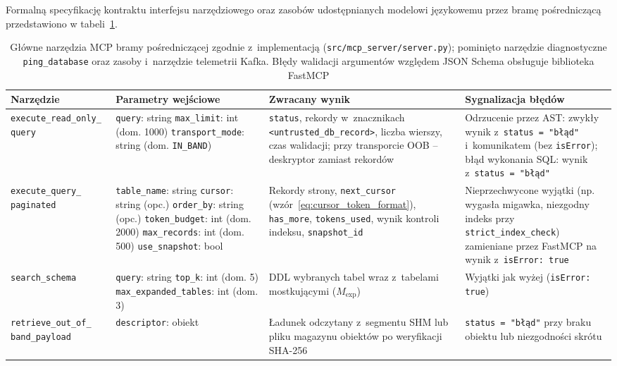 Formalną specyfikację kontraktu interfejsu narzędziowego oraz zasobów udostępnianych modelowi językowemu przez bramę pośredniczącą przedstawiono w tabeli~\ref{tab:mcp_interface_contract}.

\begin{table}[!htbp]
\centering
\footnotesize
\caption[Kontrakt interfejsu narzędziowego bramy MCP]{Główne narzędzia MCP bramy pośredniczącej zgodnie z~implementacją (\texttt{src/mcp\_server/server.py}); pominięto narzędzie diagnostyczne \texttt{ping\_database} oraz zasoby i~narzędzie telemetrii Kafka. Błędy walidacji argumentów względem JSON Schema obsługuje biblioteka FastMCP}
\label{tab:mcp_interface_contract}
\begin{tabular}{p{2.8cm} p{3.4cm} p{4.6cm} p{3.0cm}}
\toprule
\textbf{Narzędzie} & \textbf{Parametry wejściowe} & \textbf{Zwracany wynik} & \textbf{Sygnalizacja błędów} \\
\midrule
\texttt{execute\_read\_only\_} \texttt{query} &
\texttt{query}: string \newline
\texttt{max\_limit}: int (dom. 1000) \newline
\texttt{transport\_mode}: string (dom. \texttt{IN\_BAND}) &
\texttt{status}, rekordy w~znacznikach \texttt{<untrusted\_db\_record>}, liczba wierszy, czas walidacji; przy transporcie OOB -- deskryptor zamiast rekordów &
Odrzucenie przez AST: zwykły wynik z~\texttt{status = "błąd"} i~komunikatem (bez \texttt{isError}); błąd wykonania SQL: wynik z~\texttt{status = "błąd"} \\
\addlinespace
\texttt{execute\_query\_} \texttt{paginated} &
\texttt{table\_name}: string \newline
\texttt{cursor}: string (opc.) \newline
\texttt{order\_by}: string (opc.) \newline
\texttt{token\_budget}: int (dom. 2000) \newline
\texttt{max\_records}: int (dom. 500) \newline
\texttt{use\_snapshot}: bool &
Rekordy strony, \texttt{next\_cursor} (wzór~\eqref{eq:cursor_token_format}), \texttt{has\_more}, \texttt{tokens\_used}, wynik kontroli indeksu, \texttt{snapshot\_id} &
Nieprzechwycone wyjątki (np. wygasła migawka, niezgodny indeks przy \texttt{strict\_index\_check}) zamieniane przez FastMCP na wynik z~\texttt{isError: true} \\
\addlinespace
\texttt{search\_schema} &
\texttt{query}: string \newline
\texttt{top\_k}: int (dom. 5) \newline
\texttt{max\_expanded\_tables}: int (dom. 3) &
DDL wybranych tabel wraz z~tabelami mostkującymi ($M_{\text{exp}}$) &
Wyjątki jak wyżej (\texttt{isError: true}) \\
\addlinespace
\texttt{retrieve\_out\_of\_} \texttt{band\_payload} &
\texttt{descriptor}: obiekt &
Ładunek odczytany z~segmentu SHM lub pliku magazynu obiektów po weryfikacji SHA-256 &
\texttt{status = "błąd"} przy braku obiektu lub niezgodności skrótu \\
\bottomrule
\end{tabular}
\end{table}

